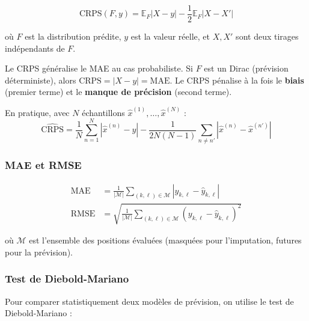 \documentclass[12pt,a4paper]{article}
\newcounter{rmqctr}[section]
\renewcommand{\thermqctr}{\thesection.\arabic{rmqctr}}
\newenvironment{remarque}[1][]
  {\refstepcounter{rmqctr}\begin{tcolorbox}[rmqstyle,title={Remarque~\thermqctr\if\relax\detokenize{#1}\relax\else~--- #1\fi}]}
  {\end{tcolorbox}}
\newcommand{\E}{\mathbb{E}}
\begin{document}
\begin{equation}
\boxed{\text{CRPS}(F, y) = \E_F|X - y| - \frac{1}{2}\E_F|X - X'|}
\label{eq:crps}
\end{equation}

o\`u $F$ est la distribution pr\'edite, $y$ est la valeur r\'eelle, et $X, X'$ sont deux tirages ind\'ependants de $F$.

\begin{remarque}
Le CRPS g\'en\'eralise le MAE au cas probabiliste. Si $F$ est un Dirac (pr\'evision d\'eterministe), alors $\text{CRPS} = |X - y| = \text{MAE}$. Le CRPS p\'enalise \`a la fois le \textbf{biais} (premier terme) et le \textbf{manque de pr\'ecision} (second terme).
\end{remarque}

En pratique, avec $N$ \'echantillons $\hat{x}^{(1)}, \ldots, \hat{x}^{(N)}$ :
\begin{equation}
\widehat{\text{CRPS}} = \frac{1}{N}\sum_{n=1}^N |\hat{x}^{(n)} - y| - \frac{1}{2N(N-1)}\sum_{n \neq n'} |\hat{x}^{(n)} - \hat{x}^{(n')}|
\end{equation}

\subsubsection{MAE et RMSE}

\begin{align}
\text{MAE} &= \frac{1}{|\mathcal{M}|}\sum_{(k,\ell) \in \mathcal{M}} |y_{k,\ell} - \hat{y}_{k,\ell}| \\
\text{RMSE} &= \sqrt{\frac{1}{|\mathcal{M}|}\sum_{(k,\ell) \in \mathcal{M}} (y_{k,\ell} - \hat{y}_{k,\ell})^2}
\end{align}

o\`u $\mathcal{M}$ est l'ensemble des positions \'evalu\'ees (masqu\'ees pour l'imputation, futures pour la pr\'evision).

\subsubsection{Test de Diebold-Mariano}

Pour comparer statistiquement deux mod\`eles de pr\'evision, on utilise le test de Diebold-Mariano \cite{diebold1995} :
\end{document}
